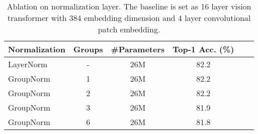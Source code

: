 \documentclass[10pt,twocolumn,letterpaper]{article}
\begin{document}
\begin{table}[t]
  \centering
  \small
  \setlength\tabcolsep{2.6mm}
  \renewcommand\arraystretch{1}
  \caption{Ablation on normalization layer. The baseline is set as 16 layer vision transformer with 384 embedding dimension and 4 layer convolutional patch embedding.}
  
  \label{tab:abl_norm}
  \begin{tabular}{lccccc} \toprule[0.5pt]
    Normalization & Groups & \#Parameters & Top-1 Acc. (\%) \\ \midrule[0.5pt] \midrule[0.5pt]
     LayerNorm & - &26M &  82.2\\
     GroupNorm& 1 &26M &  82.2\\
     GroupNorm&2 & 26M & 82.2 \\
     GroupNorm&3 & 26M & 81.9 \\
     GroupNorm& 6 &26M &  81.8\\

    \bottomrule[0.5pt]
  \end{tabular}
\end{table}
\end{document}
